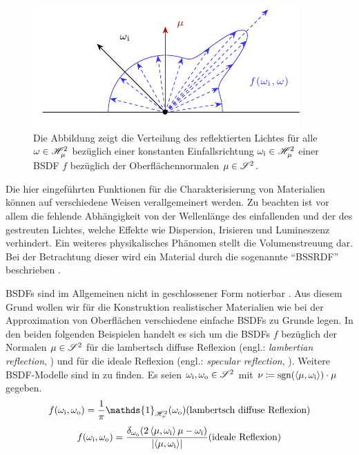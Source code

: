 		\begin{figure}[h]
			\center
			\includegraphics{gg_fig/brdf_1.pdf}
			\caption[Struktur des Beispiels einer BSDF]{Die Abbildung zeigt die Verteilung des reflektierten Lichtes für alle $\omega\in\mathscr{H}^{2}_{\mu}$ bezüglich einer konstanten Einfallsrichtung $\omega_{\mathrm{i}}\in\mathscr{H}^{2}_{\mu}$ einer BSDF $f$ bezüglich der Oberflächennormalen $\mu\in\mathscr{S}^{2}$.}
			\label{fig:brdf}
		\end{figure}

		Die hier eingeführten Funktionen für die Charakterisierung von Materialien können auf verschiedene Weisen verallgemeinert werden.
		Zu beachten ist vor allem die fehlende Abhängigkeit von der Wellenlänge des einfallenden und der des gestreuten Lichtes, welche Effekte wie Dispersion, Irisieren und Lumineszenz verhindert.
		Ein weiteres physikalisches Phänomen stellt die Volumenstreuung dar.
		Bei der Betrachtung dieser wird ein Material durch die sogenannte \enquote{BSSRDF} beschrieben \cite[S.~671~ff]{pbrt3}.


		BSDFs sind im Allgemeinen nicht in geschlossener Form notierbar \cite[S.~507~f]{pbrt3}.
		Aus diesem Grund wollen wir für die Konstruktion realistischer Materialien wie bei der Approximation von Oberflächen verschiedene einfache BSDFs zu Grunde legen.
		In den beiden folgenden Beispielen handelt es sich um die BSDFs $f$ bezüglich der Normalen $\mu\in\mathscr{S}^{2}$ für die lambertsch diffuse Reflexion (engl.: \textit{lambertian reflection}, \cite[S.~531~f]{pbrt3}) und für die ideale Reflexion (engl.: \textit{specular reflection}, \cite[S.~144~f]{veach-thesis}).
		Weitere BSDF-Modelle sind in \cite{pbrt3,veach-thesis,radiosity} zu finden.
		Es seien $\omega_{\mathrm{i}},\omega_{\mathrm{o}}\in\mathscr{S}^{2}$ mit $\nu\coloneqq\operatorname{sgn}(\left\langle \mu,\omega_{\mathrm{i}} \right\rangle)\cdot\mu$ gegeben.
		\[
			f(\omega_\m{i},\omega_\m{o}) = \frac{1}{\pi}\mathds{1}_{\shs{\nu}}(\omega_\m{o}) \hfill \text{(lambertsch diffuse Reflexion)}
		\]
		\[
			f(\omega_\m{i},\omega_\m{o}) = \frac{\delta_{\omega_\m{o}}(2\dotp{\mu}{\omega_\m{i}}\mu - \omega_\m{i})}{\abs{\dotp{\mu}{\omega_\m{i}}}} \hfill \text{(ideale Reflexion)}
		\]

